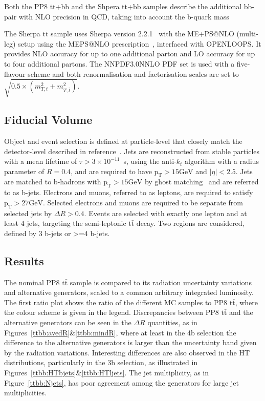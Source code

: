 Both the PP8 tt+bb and the Shpera tt+bb samples describe the additional bb-pair with NLO precision in QCD, taking into account the b-quark mass

The Sherpa $\mathrm{t\bar{t}}$ sample uses Sherpa version 2.2.1~\cite{Gleisberg:2008ta} with the ME+PS@NLO (multi-leg) setup using the MEPS@NLO prescription~\cite{Hoeche:2012yf}, interfaced with OPENLOOPS. It provides NLO accuracy for up to one additional parton and LO accuracy for up to four additional partons. The NNPDF3.0NNLO PDF set is used with a five-flavour scheme and both renormalisation and factorisation scales are set to $\sqrt{0.5\times(m_{T,t}^2+m_{T,\bar{t}}^2)}$. 


\subsection{Fiducial Volume}
Object and event selection is defined at particle-level that closely match the detector-level described in reference~\cite{HIGG-2017-03}. Jets are reconstructed from stable particles with a mean lifetime of $\tau > 3\times 10^{-11}$~s, using the anti-$k_t$ algorithm with a radius parameter of $R=0.4$, and are required to have $\mathrm{p_{T}>15 GeV}$ and $|\eta|< 2.5$. Jets are matched to b-hadrons with $\mathrm{p_{T}>15 GeV}$ by ghost matching~\cite{70ttbb} and are referred to as b-jets. Electrons and muons, referred to as leptons, are required to satisfy $\mathrm{p_{T}>27 GeV}$. Selected electrons and muons are required to be separate from selected jets by $\Delta R>0.4$. Events are selected with exactly one lepton and at least 4 jets, targeting the semi-leptonic $\mathrm{t\bar{t}}$ decay.
Two regions are considered, defined by 3 b-jets or >=4 b-jets.

\subsection{Results}
The nominal PP8 $\mathrm{t\bar{t}}$ sample is compared to its radiation uncertainty variations and alternative generators, scaled to a common arbitrary integrated luminosity.
The first ratio plot shows the ratio of the different MC samples to PP8 $\mathrm{t\bar{t}}$, where the colour scheme is given in the legend.
Discrepancies between PP8 $\mathrm{t\bar{t}}$ and the alternative generators can be seen in the $\Delta R$ quantities, as in Figures~\ref{ttbb:avedR}\&\ref{ttbb:mindR}, where at least in the 4b selection the difference to the alternative generators is larger than the uncertainty band given by the radiation variations.  
Interesting differences are also observed in the HT distributions, particularly in the 3b selection, as illustrated in Figures~\ref{ttbb:HTbjets}\&\ref{ttbb:HTljets}. The jet multiplicity, as in Figure~\ref{ttbb:Njets}, has poor agreement among the generators for large jet multiplicities.

